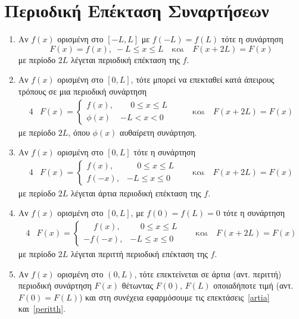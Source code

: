 \section{Περιοδική Επέκταση Συναρτήσεων}

\vspace{\baselineskip}

\begin{enumerate}

    \item Αν $ f(x) $ ορισμένη στο $ [-L,L] $ με $ f(-L)=f(L) $ τότε η συνάρτηση
        \[
            F(x) = f(x), \; -L \leq x \leq L \quad \text{και} \quad F(x+2L)=F(x)
        \]
        με περίοδο $ 2L $ λέγεται \textcolor{Col1}{περιοδική επέκταση} της $f$. 

    \item Αν $ f(x) $ ορισμένη στο $ [0,L] $, τότε μπορεί να επεκταθεί 
        κατά άπειρους τρόπους σε μια περιοδική συνάρτηση 
        \begin{alignat*}{4}
            &F(x) = 
            \begin{cases}  
                f(x), & \phantom{-} 0 \leq x \leq L \\
                \phi(x) & -L < x < 0
            \end{cases}  & \quad & \text{και} \quad F(x+2L)=F(x)
        \end{alignat*}
        με περίοδο $ 2L $, όπου $ \phi(x) $ αυθαίρετη συνάρτηση. 

    \item \label{artia} Αν $ f(x) $ ορισμένη στο $ [0,L] $ τότε η συνάρτηση 
        \begin{alignat*}{4}
            & F(x) = 
            \begin{cases}  
                f(x), & \phantom{-} 0 \leq x \leq L \\
                f(-x), & -L \leq x \leq 0
            \end{cases}  & \quad \text{και} \quad F(x+2L)=F(x)
        \end{alignat*}
        με περίοδο $ 2L $ λέγεται \textcolor{Col1}{άρτια περιοδική επέκταση} της $f$.

    \item \label{peritth} Αν $ f(x) $ ορισμένη στο $ [0,L] $, με $ f(0)=f(L)=0 $ 
        τότε η συνάρτηση
        \begin{alignat*}{4}
            &F(x) = 
            \begin{cases}  
                \phantom{-} f(x), & \phantom{-} 0 \leq x \leq L \\
                -f(-x), & -L \leq x \leq 0
            \end{cases}  & \quad \text{και} \quad F(x+2L)=F(x)
        \end{alignat*}
        με περίοδο $ 2L $ λέγεται \textcolor{Col1}{περιττή περιοδική επέκταση} της $f$.

    \item Αν $ f(x) $ ορισμένη στο $ (0,L) $, τότε επεκτείνεται σε 
        άρτια (αντ. περιττή) περιοδική συνάρτηση $ F(x) $ θέτωντας $ F(0) $, 
        $ F(L) $ οποιαδήποτε τιμή (αντ. $F(0)=F(L)$) και στη συνέχεια εφαρμόσουμε 
        τις επεκτάσεις~\ref{artia} και~\ref{peritth}.
\end{enumerate}


